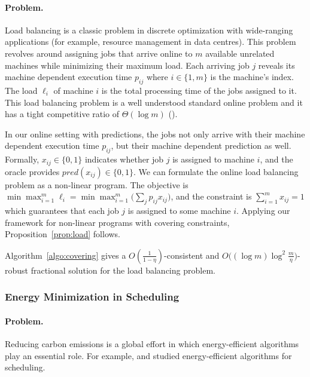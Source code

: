 \paragraph{Problem.}
Load balancing is a classic problem in discrete optimization with wide-ranging applications (for example, resource management in data centres).
This problem revolves around assigning jobs that arrive online to $m$ available unrelated machines while minimizing their maximum load.
Each arriving job $j$ reveals its machine dependent execution time $p_{ij}$ where $i \in \{1, m\}$ is the machine's index. The load $\ell_{i}$ of machine $i$ is the total processing time of the jobs assigned
to it. This load balancing problem is a well understood standard online problem and it has a tight competitive ratio of $\Theta(\log m)$ (\cite{BorodinEl-Yaniv05:Online-computation,Caragiannis08:Better-bounds}).

In our online setting with predictions, the jobs not only arrive with their machine dependent execution time $p_{ij}$, but their machine dependent prediction as well. Formally, $x_{ij} \in \{0,1\}$ indicates whether job $j$ is assigned to machine $i$, and the oracle provides $pred(x_{ij}) \in \{0,1\}$. We can formulate the online load balancing problem as a non-linear program. The objective is $\min \max_{i=1}^{m} \ell_{i} = \min \max_{i=1}^{m} \bigl(\sum_{j} p_{ij} x_{ij}\bigr)$, and the constraint is $\sum_{i=1}^{m} x_{ij} = 1$ which guarantees that each job $j$ is assigned to some machine $i$. Applying our framework for non-linear programs with covering constraints, Proposition~\ref{prop:load} follows.

\begin{proposition} \label{prop:load}
Algorithm~\ref{algo:covering} gives a
$O(\frac{1}{1 - \eta})$-consistent and $O\bigl((\log m) \log^{2} \frac{m}{\eta}\bigr)$-robust fractional solution
for the load balancing problem.
\end{proposition}

\subsubsection{Energy Minimization in Scheduling}

\paragraph{Problem.}
Reducing carbon emissions is a global effort in which energy-efficient algorithms play an essential role. For example, \cite{Albers10:Energy-efficient-algorithms} and \cite{GuCaiZengZhangJinDai:2019} studied energy-efficient algorithms for scheduling.

